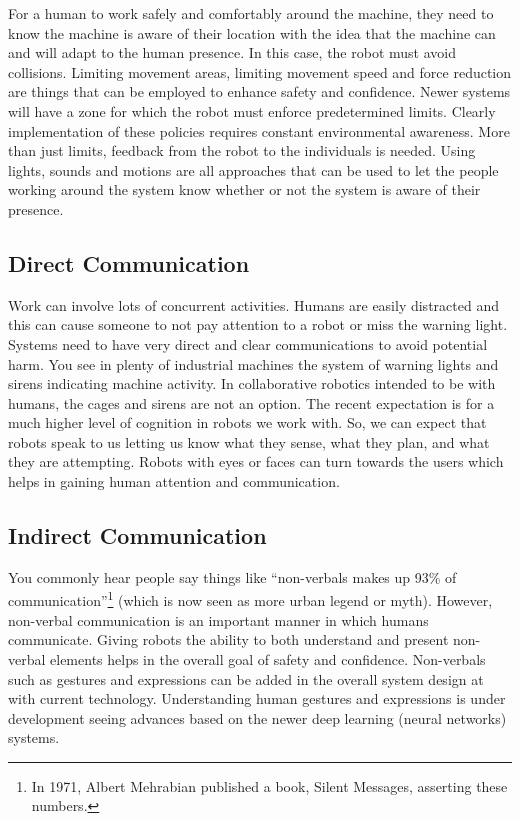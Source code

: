 For a human to work safely and comfortably around the machine, they need
to know the machine is aware of their location with the idea that the
machine can and will adapt to the human presence. In this case, the
robot must avoid collisions. Limiting movement areas, limiting movement
speed and force reduction are things that can be employed to enhance
safety and confidence. Newer systems will have a zone for which the
robot must enforce predetermined limits. Clearly implementation of these
policies requires constant environmental awareness. More than just
limits, feedback from the robot to the individuals is needed. Using
lights, sounds and motions are all approaches that can be used to let
the people working around the system know whether or not the system is
aware of their presence.

\hypertarget{direct-communication}{%
\subsection{Direct Communication}\label{direct-communication}}

Work can involve lots of concurrent activities. Humans are easily
distracted and this can cause someone to not pay attention to a robot or
miss the warning light. Systems need to have very direct and clear
communications to avoid potential harm. You see in plenty of industrial
machines the system of warning lights and sirens indicating machine
activity. In collaborative robotics intended to be with humans, the
cages and sirens are not an option. The recent expectation is for a much
higher level of cognition in robots we work with. So, we can expect that
robots speak to us letting us know what they sense, what they plan, and
what they are attempting. Robots with eyes or faces can turn towards the
users which helps in gaining human attention and communication.

\hypertarget{indirect-communication}{%
\subsection{Indirect Communication}\label{indirect-communication}}

You commonly hear people say things like ``non-verbals makes up 93\% of
communication''\footnote{In 1971, Albert Mehrabian published a book,
  Silent Messages, asserting these numbers.} (which is now seen as more
urban legend or myth). However, non-verbal communication is an important
manner in which humans communicate. Giving robots the ability to both
understand and present non-verbal elements helps in the overall goal of
safety and confidence. Non-verbals such as gestures and expressions can
be added in the overall system design at with current technology.
Understanding human gestures and expressions is under development seeing
advances based on the newer deep learning (neural networks) systems.

